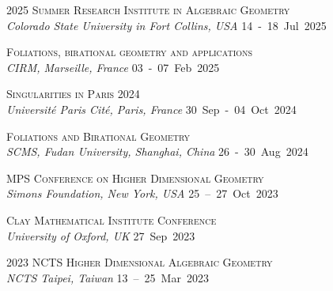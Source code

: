 \documentclass[11pt, a4paper]{article}
\newcommand{\nbdates}[1]{\hfill\mbox{#1}} %
\begin{document}
\begin{minipage}[t]{0.56\textwidth}
	\textsc{2025 Summer Research Institute in Algebraic Geometry}\\
	\textit{Colorado State University in Fort Collins, USA} \nbdates{14 - 18 Jul 2025}

	\textsc{Foliations, birational geometry and applications}\\
	\textit{CIRM, Marseille, France} \nbdates{03 - 07 Feb 2025}

	\textsc{Singularities in Paris 2024}\\
	\textit{Université Paris Cité, Paris, France} \nbdates{30 Sep - 04 Oct 2024}

	\textsc{Foliations and Birational Geometry}\\
	\textit{SCMS, Fudan University, Shanghai, China} \nbdates{26 - 30 Aug 2024}

	\textsc{MPS Conference on Higher Dimensional Geometry}\\
	\textit{Simons Foundation, New York, USA} \nbdates{25 -- 27 Oct 2023}

	\textsc{Clay Mathematical Institute Conference}\\
	\textit{University of Oxford, UK} \nbdates{27 Sep 2023}

	\textsc{2023 NCTS Higher Dimensional Algebraic Geometry}\\
	\textit{NCTS Taipei, Taiwan} \nbdates{13 -- 25 Mar 2023}

\end{minipage}
\end{document}
